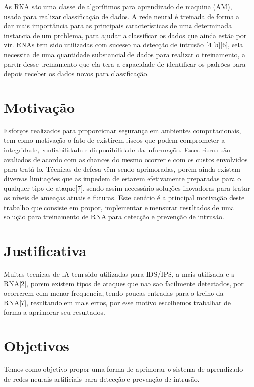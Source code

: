 \documentclass[
	12pt,				%
	openright,			%
	oneside,
	a4paper,			%
	english,			%
	french,				%
	spanish,			%
	brazil				%
	]{abntex2}
\begin{document}
As RNA são uma classe de algorítimos para aprendizado de maquina (AM), usada para realizar classificação de dados. A rede neural é treinada de forma a dar mais importância para as principais características de uma determinada instancia de um problema, para ajudar a classificar os dados que ainda estão por vir. 
RNAs tem sido utilizadas com sucesso na detecção de intrusão [4][5][6], sela necessita de uma quantidade substancial de dados para realizar o treinamento, a partir desse treinamento que ela tera a capacidade de identificar os padrões para depois receber os dados novos para classificação.


\section{Motivação}

Esforços realizados para proporcionar segurança em ambientes computacionais, tem como motivação o fato de existirem riscos que podem comprometer a integridade, confiabilidade e disponibilidade da informação. 
Esses riscos são avaliados de acordo com as chances do mesmo ocorrer e com os custos envolvidos para tratá-lo. Técnicas de defesa vêm sendo aprimoradas, porém ainda existem diversas limitações que as impedem de estarem efetivamente preparadas para o qualquer tipo de ataque[7], sendo assim necessário  soluções inovadoras para tratar os níveis de ameaças atuais e futuras. 
Este cenário é a principal motivação deste trabalho que consiste em propor, implementar e mensurar resultados de uma solução para treinamento de RNA para detecção e prevenção de intrusão.

\section{Justificativa}

Muitas tecnicas de IA tem sido utilizadas para IDS/IPS, a mais utilizada e a RNA[2], porem existem tipos de ataques que nao sao facilmente detectados, por ocorrerem com menor frequencia, tendo poucas entradas para o treino da RNA[7], resultando em mais erros,  por esse motivo escolhemos trabalhar de forma a aprimorar seu resultados.


\section{Objetivos}

Temos como objetivo propor uma forma de aprimorar o sistema de aprendizado de redes neurais artificiais para detecção e prevenção de intrusão.
\end{document}

